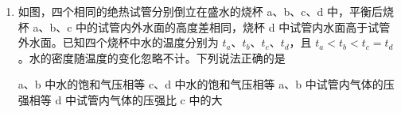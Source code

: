 \documentclass[\gkver]{gaokaozhenti}
\begin{document}
\begin{enumerate}
{定值电阻的功率为

$P_{R} = I^{2}R = \frac{B^{2}L^{2}v^{2}}{R}$

若 $P_{F} = 2P_{R}$ 时，即 $\frac{B^{2}L^{2}v_{0}}{R}v = 2\frac{B^{2}L^{2}v^{2}}{R}$

化简可得金属棒速度 $v$ 的大小为 $v = \frac{v_{0}}{2}$

（2）断开开关 S，电容器充电，则电容器与定值电阻串联，则有

$E = BLv = IR + \frac{q}{C}$

当金属棒匀速运动时，电容器不断充电，电荷量 $q$ 不断增大，电路中电流不断减小，则金属棒所受安培力 $F_{\text{安}} = BIL$ 不断减小，而拉力的功率

$P_{F} = F'v = BILv$

定值电阻功率 $P_{R} = I^{2}R$

当 $P_{F} = 2P_{R}$ 时有 $BILv = 2I^{2}R$

可得 $IR = \frac{BLv}{2}$

根据 $E = BLv = IR + \frac{q}{C}$

可得此时电容器两端电压为 $U_{c} = \frac{q}{C} = \frac{BLv}{2} = \frac{1}{4}BLv_{0}$

从开关断开到此刻外力所做的功为 $W = \sum BIL(v \cdot \Delta t) = BLv\sum I \cdot \Delta t = BLvq$

其中 $q = \frac{CBLv}{2}$

联立可得 $W = \frac{1}{8}CB^{2}L^{2}v_{0}^{2}$
}

\item
如图，四个相同的绝热试管分别倒立在盛水的烧杯 a、b、c、d 中，平衡后烧杯 a、b、c 中的试管内外水面的高度差相同，烧杯 d 中试管内水面高于试管外水面。已知四个烧杯中水的温度分别为 $t_{a}$、$t_{b}$、$t_{c}$、$t_{d}$，且 $t_{a} < t_{b} < t_{c} = t_{d}$。水的密度随温度的变化忽略不计。下列说法正确的是


{a、b 中水的饱和气压相等}
{c、d 中水的饱和气压相等}
{a、b 中试管内气体的压强相等}
{d 中试管内气体的压强比 c 中的大}

\end{enumerate}
\end{document}
